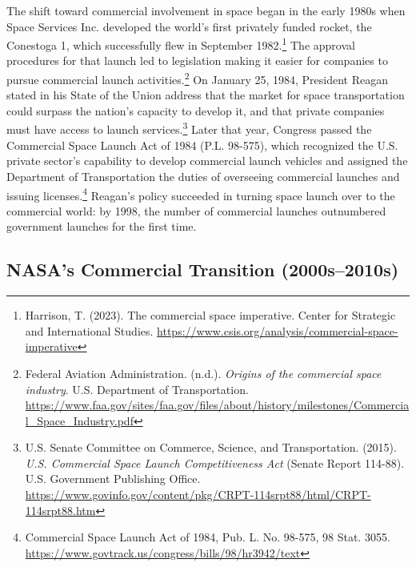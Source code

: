 The shift toward commercial involvement in space began in the early 1980s when Space Services Inc. developed the world’s first privately funded rocket, the Conestoga 1, which successfully flew in September 1982.\footnote{Harrison, T. (2023). The commercial space imperative. Center for Strategic and International Studies. \url{https://www.csis.org/analysis/commercial-space-imperative}} The approval procedures for that launch led to legislation making it easier for companies to pursue commercial launch activities.\footnote{Federal Aviation Administration. (n.d.). \emph{Origins of the commercial space industry}. U.S. Department of Transportation. \url{https://www.faa.gov/sites/faa.gov/files/about/history/milestones/Commercial_Space_Industry.pdf}} On January 25, 1984, President Reagan stated in his State of the Union address that the market for space transportation could surpass the nation’s capacity to develop it, and that private companies must have access to launch services.\footnote{U.S. Senate Committee on Commerce, Science, and Transportation. (2015). \emph{U.S. Commercial Space Launch Competitiveness Act} (Senate Report 114-88). U.S. Government Publishing Office. \url{https://www.govinfo.gov/content/pkg/CRPT-114srpt88/html/CRPT-114srpt88.htm}} Later that year, Congress passed the Commercial Space Launch Act of 1984 (P.L. 98-575), which recognized the U.S. private sector’s capability to develop commercial launch vehicles and assigned the Department of Transportation the duties of overseeing commercial launches and issuing licenses.\footnote{Commercial Space Launch Act of 1984, Pub. L. No. 98-575, 98 Stat. 3055. \url{https://www.govtrack.us/congress/bills/98/hr3942/text}} Reagan’s policy succeeded in turning space launch over to the commercial world: by 1998, the number of commercial launches outnumbered government launches for the first time.

\subsection{NASA’s Commercial Transition (2000s–2010s)}

